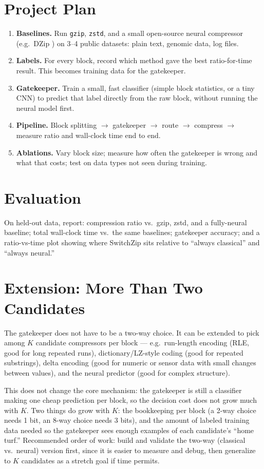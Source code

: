 \documentclass[11pt]{article}
\begin{document}
\section{Project Plan}
\begin{enumerate}[nosep]
  \item \textbf{Baselines.} Run \texttt{gzip}, \texttt{zstd}, and a small
  open-source neural compressor (e.g.\ DZip \cite{goyal2018dzip}) on
  3--4 public datasets: plain text, genomic data, log files.
  \item \textbf{Labels.} For every block, record which method gave the
  best ratio-for-time result. This becomes training data for the
  gatekeeper.
  \item \textbf{Gatekeeper.} Train a small, fast classifier (simple
  block statistics, or a tiny CNN) to predict that label directly from
  the raw block, without running the neural model first.
  \item \textbf{Pipeline.} Block splitting $\to$ gatekeeper $\to$ route
  $\to$ compress $\to$ measure ratio and wall-clock time end to end.
  \item \textbf{Ablations.} Vary block size; measure how often the
  gatekeeper is wrong and what that costs; test on data types not seen
  during training.
\end{enumerate}

\section{Evaluation}
On held-out data, report: compression ratio vs.\ gzip, zstd, and a
fully-neural baseline; total wall-clock time vs.\ the same baselines;
gatekeeper accuracy; and a ratio-vs-time plot showing where SwitchZip
sits relative to ``always classical'' and ``always neural.''

\section{Extension: More Than Two Candidates}
The gatekeeper does not have to be a two-way choice. It can be extended to
pick among $K$ candidate compressors per block --- e.g.\ run-length
encoding (RLE, good for long repeated runs), dictionary/LZ-style coding
(good for repeated substrings), delta encoding (good for numeric or
sensor data with small changes between values), and the neural predictor
(good for complex structure).

This does not change the core mechanism: the gatekeeper is still a
classifier making one cheap prediction per block, so the decision cost
does not grow much with $K$. Two things do grow with $K$: the bookkeeping
per block (a 2-way choice needs 1 bit, an 8-way choice needs 3 bits), and
the amount of labeled training data needed so the gatekeeper sees enough
examples of each candidate's ``home turf.'' Recommended order of work:
build and validate the two-way (classical vs.\ neural) version first,
since it is easier to measure and debug, then generalize to $K$ candidates
as a stretch goal if time permits.
\end{document}
